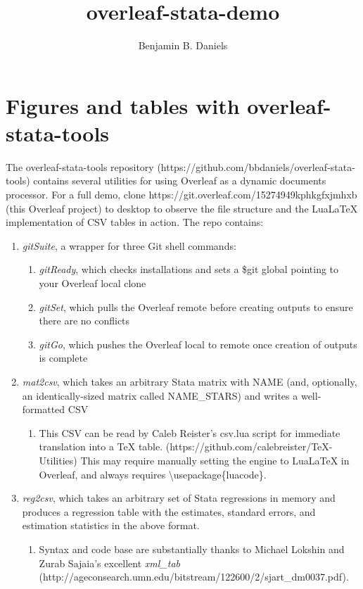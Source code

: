 \documentclass[a4paper]{article}
\title{overleaf-stata-demo}
\author{Benjamin B. Daniels}
\begin{document}
\maketitle

\section{Figures and tables with overleaf-stata-tools}

The overleaf-stata-tools repository (https://github.com/bbdaniels/overleaf-stata-tools) contains several utilities for using Overleaf as a dynamic documents processor. For a full demo, clone https://git.overleaf.com/15274949kphkgfxjmhxb (this Overleaf project) to desktop to observe the file structure and the LuaLaTeX implementation of CSV tables in action. The repo contains:

\begin{enumerate}
\item {\it gitSuite}, a wrapper for three Git shell commands:
	\begin{enumerate}
	\item {\it gitReady}, which checks installations and sets a \${git} global pointing to your Overleaf local clone
    \item {\it gitSet}, which pulls the Overleaf remote before creating outputs to ensure there are no conflicts
    \item {\it gitGo}, which pushes the Overleaf local to remote once creation of outputs is complete
    \end{enumerate}
\item {\it mat2csv}, which takes an arbitrary Stata matrix with NAME (and, optionally, an identically-sized matrix called NAME\_STARS) and writes a well-formatted CSV
	\begin{enumerate}
	\item This CSV can be read by Caleb Reister's csv.lua script for immediate translation into a TeX table. (https://github.com/calebreister/TeX-Utilities) This may require manually setting the engine to LuaLaTeX in Overleaf, and always requires \textbackslash usepackage\{luacode\}.
    \end{enumerate}
\item {\it reg2csv}, which takes an arbitrary set of Stata regressions in memory and produces a regression table with the estimates, standard errors, and estimation statistics in the above format.
	\begin{enumerate}
	\item Syntax and code base are substantially thanks to Michael Lokshin and Zurab Sajaia's excellent {\it xml\_tab} (http://ageconsearch.umn.edu/bitstream/122600/2/sjart\_dm0037.pdf).
    \end{enumerate}

\end{enumerate}
\end{document}
